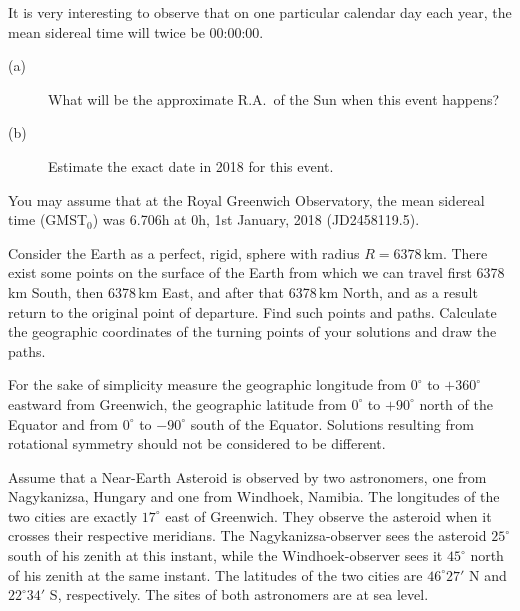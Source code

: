 It is very interesting to observe that on one particular calendar day each
year, the mean sidereal time will twice be 00:00:00.

\begin{description}
\item[(a)] What will be the approximate R.A.\ of the Sun when this event
  happens?
\item[(b)] Estimate the exact date in 2018 for this event.
\end{description}

You may assume that at the Royal Greenwich Observatory, the mean sidereal time
(GMST$_0$) was 6.706h at 0h, 1st January, 2018 (JD2458119.5).

Consider the Earth as a perfect, rigid, sphere with radius $R = 6378$\,km.
There exist some points on the surface of the Earth from which we can travel
first 6378\,km South, then 6378\,km East, and after that 6378\,km North, and as
a result return to the original point of departure. Find such points and paths.
Calculate the geographic coordinates of the turning points of your solutions
and draw the paths.

For the sake of simplicity measure the geographic longitude from $0^\circ$ to
$+360^\circ$ eastward from Greenwich, the geographic latitude from $0^\circ$ to
$+90^\circ$ north of the Equator and from $0^\circ$ to $-90^\circ$ south of the
Equator. Solutions resulting from rotational symmetry should not be considered
to be different.

Assume that a Near-Earth Asteroid is observed by two astronomers, one from
Nagykanizsa, Hungary and one from Windhoek, Namibia. The longitudes of the two
cities are exactly $17^\circ$ east of Greenwich. They observe the asteroid when
it crosses their respective meridians. The Nagykanizsa-observer sees the
asteroid $25^\circ$ south of his zenith at this instant, while the
Windhoek-observer sees it $45^\circ$ north of his zenith at the same instant.
The latitudes of the two cities are $46^\circ 27'$ N and $22^\circ 34'$ S,
respectively. The sites of both astronomers are at sea level.

